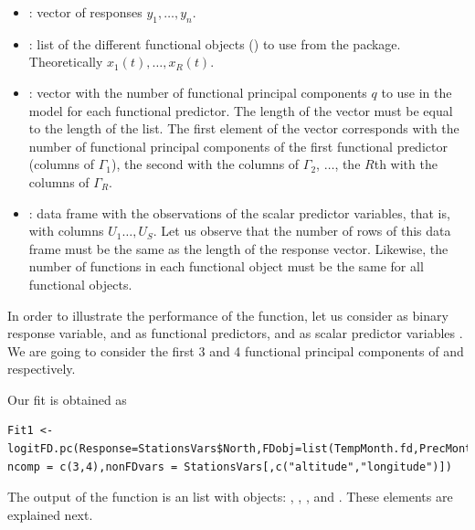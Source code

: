 \begin{itemize} 
\item {}: vector of responses $y_{1},\ldots ,y_{n}.$ 
\item {}: list of the different functional objects () to use from the  package. Theoretically $x_1(t),\ldots,x_R(t).$
\item {}: vector with the number of functional principal components $q$ to use in the model for each functional predictor. The length of the vector must be equal to the length of the  list. The first element of the vector corresponds with the number of functional principal components of the first functional predictor (columns of $\Gamma_1$), the second with the columns of $\Gamma_2$, $\ldots$, the $R$th with the columns of $\Gamma_R.$
\item {}: data frame with the observations of the scalar predictor variables, that is, with columns $U_1\ldots,U_S.$ Let us observe that the number of rows of this data frame must be the same as the length of the response vector. Likewise, the number of functions in each functional object must be the same for all functional objects.
\end{itemize} 

In order to illustrate the performance of the function, let us consider  as binary response variable,  and  as functional predictors, and as scalar predictor variables . We are going to consider the first 3 and 4 functional principal components of  and  respectively.

Our fit is obtained as

\begin{verbatim}
Fit1 <- logitFD.pc(Response=StationsVars$North,FDobj=list(TempMonth.fd,PrecMonth.fd),
ncomp = c(3,4),nonFDvars = StationsVars[,c("altitude","longitude")])
\end{verbatim}

The output of the function is an  list with objects: , , ,  and . These elements are explained next.

